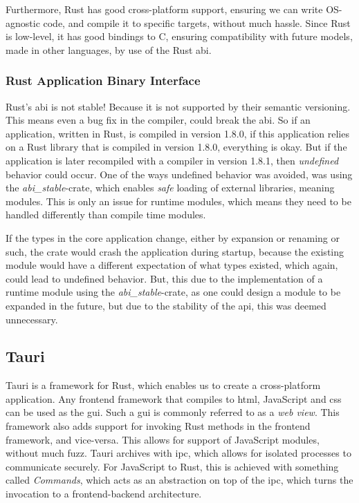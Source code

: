Furthermore, Rust has good cross-platform support, ensuring
we can write OS-agnostic code, and compile it to specific targets, without much
hassle. Since Rust is low-level, it has good bindings to C, ensuring
compatibility with future models, made in other languages, by use of the Rust
\gls*{abi}.

\subsubsection{Rust Application Binary Interface}

Rust's \gls*{abi} is not stable! Because it is not supported by their semantic
versioning. This means even a bug fix in the compiler, could break the
\gls*{abi}. So if an application, written in Rust, is compiled in version 1.8.0,
if this application relies on a Rust library that is compiled in version 1.8.0,
everything is okay. But if the application is later recompiled with a compiler
in version 1.8.1, then \textit{undefined} behavior could occur. One of the ways
undefined behavior was avoided, was using the \textit{abi\_stable}-crate, which
enables \textit{safe} loading of external libraries, meaning modules. This is
only an issue for runtime modules, which means they need to be handled
differently than compile time modules.

If the types in the core application change, either by expansion or renaming or
such, the crate would crash the application during startup, because the existing
module would have a different expectation of what types existed, which again,
could lead to undefined behavior. But, this due to the implementation of a
runtime module using the \textit{abi\_stable}-crate, as one could design a
module to be expanded in the future, but due to the stability of the \gls*{api},
this was deemed unnecessary.

\subsection{Tauri}

Tauri is a framework for Rust, which enables us to create a cross-platform
application. Any frontend framework that compiles to \gls*{html}, JavaScript and
\gls*{css} can be used as the \gls*{gui}. Such a \gls*{gui} is commonly referred to
as a \textit{web view}. This framework also adds support for invoking Rust
methods in the frontend framework, and vice-versa. This allows for support of
JavaScript modules, without much fuzz. Tauri archives with \gls*{ipc}, which
allows for isolated processes to communicate securely. For JavaScript to Rust,
this is achieved with something called \textit{Commands}, which acts as an
abstraction on top of the \gls*{ipc}, which turns the invocation to a
frontend-backend architecture.

